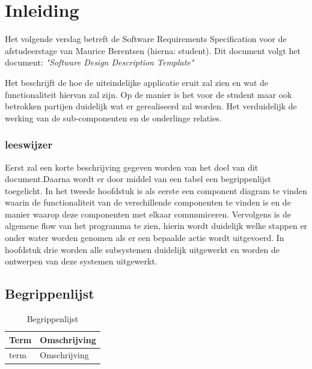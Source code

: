 \documentclass[a4paper, 11pt, oneside]{report}
\begin{document}

\tableofcontents
\clearpage





\chapter{Inleiding}
\label{inleiding}
Het volgende verslag betreft de Software Requirements Specification voor de afstudeerstage van Maurice Berentsen (hierna: student).
Dit document volgt het document: \textit{"Software Design Description Template"} \cite{template:sdd}

Het beschrijft de hoe de uiteindelijke applicatie eruit zal zien en wat de functionaliteit hiervan zal zijn. Op de manier is het voor de student maar ook betrokken partijen duidelijk wat er gerealiseerd zal worden. Het verduidelijk de werking van de sub-componenten en de onderlinge relaties. 

\subsection{leeswijzer}
\label{inleiding:beschrijving:leeswijzer}
Eerst zal een korte beschrijving gegeven worden van het doel van dit document.Daarna wordt er door middel van een tabel een begrippenlijst toegelicht. In het tweede hoofdstuk is als eerste een component diagram te vinden waarin de functionaliteit van de verschillende componenten te vinden is en de manier waarop deze componenten met elkaar communiceren. Vervolgens is de algemene flow van het programma te zien, hierin wordt duidelijk welke stappen er onder water worden genomen als er een bepaalde actie wordt uitgevoerd. In hoofdstuk drie worden alle subsystemen duidelijk uitgewerkt en worden de ontwerpen van deze systemen uitgewerkt. 
\section{Begrippenlijst}
\label{inleiding:begrippenlijst}

\begin{table}[H]
\centering

\label{begrippen}
\begin{tabular}{|l|l|}
\hline
\rowcolor[HTML]{C0C0C0}
Term        & Omschrijving                                                         \\ \hline
term        & Omschrijving                                                      	\\ \hline

\end{tabular}
\caption{Begrippenlijst}
\end{table}
\end{document}
